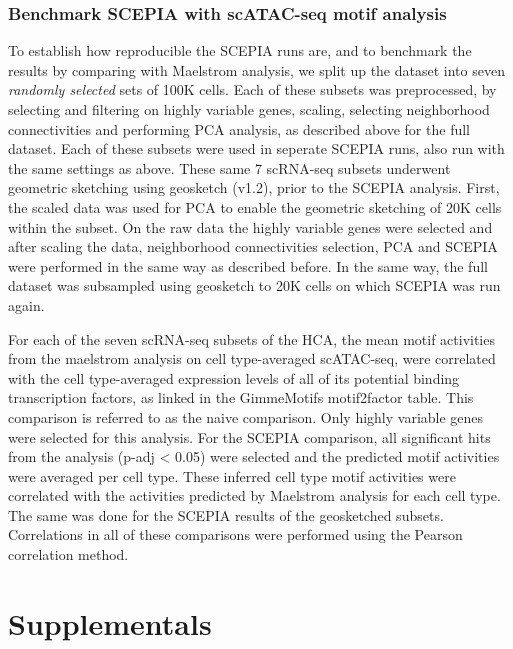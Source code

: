\subsubsection{Benchmark SCEPIA with scATAC-seq motif analysis}

To establish how reproducible the SCEPIA runs are, and to benchmark the results by comparing with Maelstrom analysis, we split up the dataset into seven \textit{randomly selected} sets of 100K cells. Each of these subsets was preprocessed, by selecting and filtering on highly variable genes, scaling, selecting neighborhood connectivities and performing PCA analysis, as described above for the full dataset. Each of these subsets were used in seperate SCEPIA runs, also run with the same settings as above. These same 7 scRNA-seq subsets underwent geometric sketching using geosketch (v1.2), prior to the SCEPIA analysis. First, the scaled data was used for PCA to enable the geometric sketching of 20K cells within the subset. On the raw data the highly variable genes were selected and after scaling the data, neighborhood connectivities selection, PCA and SCEPIA were performed in the same way as described before. In the same way, the full dataset was subsampled using geosketch to 20K cells on which SCEPIA was run again.

For each of the seven scRNA-seq subsets of the HCA, the mean motif activities from the maelstrom analysis on cell type-averaged scATAC-seq, were correlated with the cell type-averaged expression levels of all of its potential binding transcription factors, as linked in the GimmeMotifs motif2factor table. This comparison is referred to as the naive comparison. Only highly variable genes were selected for this analysis. For the SCEPIA comparison, all significant hits from the analysis (p-adj < 0.05) were selected and the predicted motif activities were averaged per cell type. These inferred cell type motif activities were correlated with the activities predicted by Maelstrom analysis for each cell type. The same was done for the SCEPIA results of the geosketched subsets. Correlations in all of these comparisons were performed using the Pearson correlation method.

\section{Supplementals}

\beginsupplement

